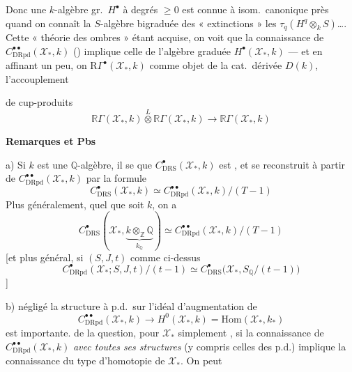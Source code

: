 \documentclass[11pt,a4paper]{article}
\begin{document}
Donc une $k$-algèbre gr.\ $H^\bullet$ à degrés $\geq 0$ \struck{\ill{}} est connue à isom.\ canonique près quand on connaît la $S$-algèbre bigraduée  des « extinctions »   les $\tau_q(H^q \otimes_k S)$….  Cette « théorie des ombres » étant  acquise, on voit que la connaissance de $C^{\bullet\bullet}_{\mathrm{DRpd}}(\mathcal{X}_*, k)$ () implique celle de l'algèbre graduée $H^\bullet(\mathcal{X}_*, k)$ — et en affinant un peu, on  \struck{\ill{}}  $\mathrm{R}\Gamma^\bullet(\mathcal{X}_*, k)$ comme objet de la cat.\ dérivée $D(k)$, \struck{\ill{}} l'accouplement

 de cup-produits
\[ \mathbb{R}\Gamma(\mathcal{X}_*, k) \overset{L}{\otimes} \mathbb{R}\Gamma(\mathcal{X}_*, k) \to \mathbb{R}\Gamma(\mathcal{X}_*, k) \]

\textbf{Remarques et Pbs}

a) Si $k$ est une $\mathbb{Q}$-algèbre, il se  que $C^\bullet_{\mathrm{DRS}}(\mathcal{X}_*, k)$ est , et se reconstruit à partir de $C^{\bullet\bullet}_{\mathrm{DRpd}}(\mathcal{X}_*, k)$ \struck{\ill{}} par la formule
\[ C^\bullet_{\mathrm{DRS}}(\mathcal{X}_*, k) \simeq C^{\bullet\bullet}_{\mathrm{DRpd}}(\mathcal{X}_*, k)/(T-1) \]
Plus généralement, quel que soit $k$, on a
\[ C^\bullet_{\mathrm{DRS}}(\mathcal{X}_*, \underbrace{k \otimes_{\mathbb{Z}} \mathbb{Q}}_{k_{\mathbb{Q}}}) \simeq C^{\bullet\bullet}_{\mathrm{DRpd}}(\mathcal{X}_*, k)/(T-1) \]
[et plus général, si $(S,J,t)$ comme ci-dessus
\[ C^\bullet_{\mathrm{DRpd}}(\mathcal{X}_*; S,J,t)/(t-1) \simeq C^\bullet_{\mathrm{DRS}}\bigl(\mathcal{X}_*, S_{\mathbb{Q}}/(t-1)\bigr) \]
]

b)  négligé  la structure à p.d.\ sur l'idéal d'augmentation de
\[ C^{\bullet\bullet}_{\mathrm{DRpd}}(\mathcal{X}_*, k) \to H^0(\mathcal{X}_*, k) = \mathrm{Hom}(\mathcal{X}_*, k_*) \]
 est importante.   de la question, pour $\mathcal{X}_*$ simplement , si la connaissance de $C^{\bullet\bullet}_{\mathrm{DRpd}}(\mathcal{X}_*, k)$ \emph{avec toutes ses structures} (y compris celles des p.d.) implique  la connaissance du type d'homotopie de $\mathcal{X}_*$. On peut
\end{document}
